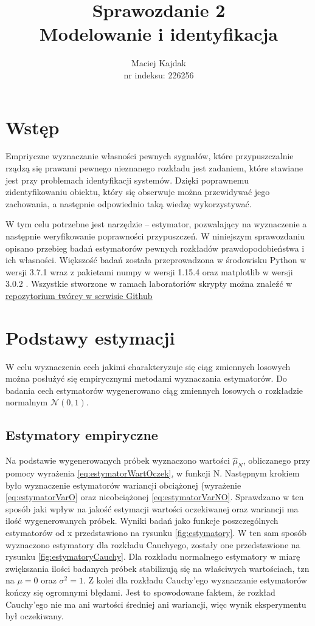 \documentclass[12pt,a4paper]{article}
\author{Maciej Kajdak\\nr indeksu: 226256}
\title{Sprawozdanie 2 \\ \textbf{Modelowanie i identyfikacja}}
\begin{document}
\maketitle
\section{Wstęp}
Empriyczne wyznaczanie własności pewnych sygnałów, które przypuszczalnie rządzą się prawami pewnego nieznanego rozkładu jest zadaniem, które stawiane jest przy problemach identyfikacji systemów.
Dzięki poprawnemu zidentyfikowaniu obiektu, który się obserwuje można przewidywać jego zachowania, a następnie odpowiednio taką wiedzę wykorzystywać.

W tym celu potrzebne jest narzędzie -- estymator, pozwalający na wyznaczenie a następnie weryfikowanie poprawności przypuszczeń.
W niniejszym sprawozdaniu opisano przebieg badań estymatorów pewnych rozkładów prawdopodobieństwa i ich własności.
Większość badań została przeprowadzona w środowisku Python w wersji 3.7.1 \cite{python3} wraz z pakietami numpy w wersji 1.15.4 \cite{numpy} oraz matplotlib w wersji 3.0.2 \cite{matplotlib}.
Wszystkie stworzone w ramach laboratoriów skrypty można znaleźć w \href{https://github.com/MacAndKaj/Modeling\_and\_Identification}{\underline{repozytorium twórcy w serwisie Github}}

\section{Podstawy estymacji}
W celu wyznaczenia cech jakimi charakteryzuje się ciąg zmiennych losowych można posłużyć się empirycznymi metodami wyznaczania estymatorów.
Do badania cech estymatorów wygenerowano ciąg zmiennych losowych o rozkładzie normalnym $\mathcal{N}(0,1)$.

\subsection{Estymatory empiryczne}
Na podstawie wygenerowanych próbek wyznaczono wartości $\hat{\mu}_{N}$, obliczanego przy pomocy wyrażenia \ref{eq:estymatorWartOczek}, w funkcji N.
Następnym krokiem było wyznaczenie estymatorów wariancji obciążonej (wyrażenie \ref{eq:estymatorVarO} oraz nieobciążonej \ref{eq:estymatorVarNO}.
Sprawdzano w ten sposób jaki wpływ na jakość estymacji wartości oczekiwanej oraz wariancji ma ilość wygenerowanych próbek.
Wyniki badań jako funkcje poszczególnych estymatorów od x przedstawiono na rysunku \ref{fig:estymatory}.
W ten sam sposób wyznaczono estymatory dla rozkładu Cauchyego, zostały one przedstawione na rysunku \ref{fig:estymatoryCauchy}.
Dla rozkładu normalnego estymatory w miarę zwiększania ilości badanych próbek stabilizują się na właściwych wartościach, tzn na $\mu=0$ oraz $\sigma^{2}=1$.
Z kolei dla rozkładu Cauchy'ego wyznaczanie estymatorów kończy się ogromnymi błędami.
Jest to spowodowane faktem, że rozkład Cauchy'ego nie ma ani wartości średniej ani wariancji, więc wynik eksperymentu był oczekiwany.
\end{document}
